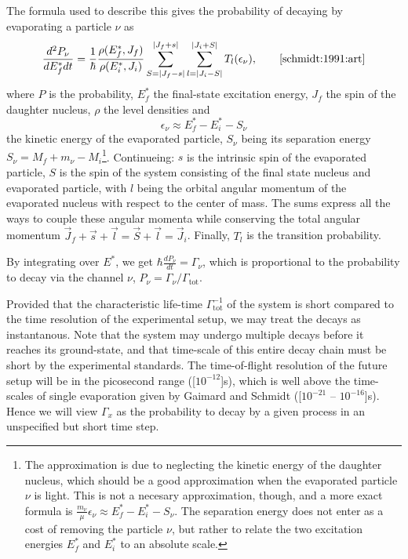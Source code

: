 The formula used to describe this gives the probability of decaying by evaporating a particle $\nu$ as
\begin{equation}
\frac{d^2 P_\nu}{dE_f^* dt} = \frac{1}{\hbar} \frac{\rho(E_f^*,J_f)}{\rho(E_i^*,J_i)} \sum_{S=|J_f-s|}^{|J_f+s|}\sum_{l=|J_i-S|}^{|J_i+S|} T_l(\epsilon_\nu),\qquad\cite{schmidt:1991:art}\label{eq:ew}
\end{equation}
where $P$ is the probability, $E_f^*$ the final-state excitation energy, $J_f$ the spin of the daughter nucleus, $\rho$ the level densities and 
\begin{equation}
\epsilon_\nu \approx E_f^*-E_i^*-S_\nu\label{eq:kine}
\end{equation}
the kinetic energy of the evaporated particle, $S_\nu$ being its separation energy $S_\nu = M_f + m_\nu - M_i$\footnote{The approximation is due to neglecting the kinetic energy of the daughter nucleus, which should be a good approximation when the evaporated particle $\nu$ is light. This is not a necesary approximation, though, and a more exact formula is $\tfrac{m_\nu}{\mu}\epsilon_\nu \approx E_f^*-E_i^*-S_\nu$. The separation energy does not enter as a cost of removing the particle $\nu$, but rather to relate the two excitation energies $E_f^*$ and $E_i^*$ to an absolute scale.}. 
 Continueing: $s$ is the intrinsic spin of the evaporated particle, $S$ is the spin of the system consisting of the final state nucleus and evaporated particle, with $l$ being the orbital angular momentum of the evaporated nucleus with respect to the center of mass. The sums express all the ways to couple these angular momenta while conserving the total angular momentum $\vec{J}_f+\vec{s} +\vec{l}= \vec{S} +\vec{l}= \vec{J}_i$. Finally, $T_l$ is the transition probability.%

By integrating over $E^*$, we get $\hbar \frac{d P_\nu}{dt} = \Gamma_\nu$, which is proportional to the probability to decay via the channel $\nu$, $P_\nu = \Gamma_\nu/\Gamma_{\text{tot}}$. 

Provided that the characteristic life-time $\Gamma_\text{tot}^{-1}$ of the system is short compared to the time resolution of the experimental setup, we may treat the decays as instantanous. Note that the system may undergo multiple decays before it reaches its ground-state, and that time-scale of this entire decay chain must be short by the experimental standards. 
The time-of-flight resolution of the future \rtb{} setup will be in the picosecond range (\unit[$10^{-12}$]{s})\cite{r3b:online}, which is well above the time-scales of single evaporation given by Gaimard and Schmidt (\unit[$10^{-21}$ -- $10^{-16}$]{s})\cite{gaimard:1991:art}. Hence we will view $\Gamma_x$ as the probability to decay by a given process in an unspecified but short time step.

